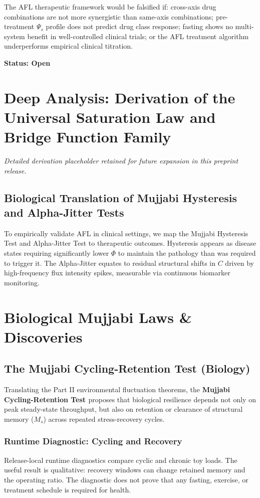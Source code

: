 \documentclass[12pt,a4paper]{article}
\begin{document}
The AFL therapeutic framework would be falsified if: cross-axis drug combinations are not more synergistic than same-axis combinations; pre-treatment $\Psi_s$ profile does not predict drug class response; fasting shows no multi-system benefit in well-controlled clinical trials; or the AFL treatment algorithm underperforms empirical clinical titration.

\textbf{Status: Open}


\section{Deep Analysis: Derivation of the Universal Saturation Law and Bridge Function Family}
\noindent\textit{Detailed derivation placeholder retained for future expansion in this preprint release.}


\subsection{Biological Translation of Mujjabi Hysteresis and Alpha-Jitter Tests}
To empirically validate AFL in clinical settings, we map the Mujjabi Hysteresis Test and Alpha-Jitter Test to therapeutic outcomes. Hysteresis appears as disease states requiring significantly lower $\Phi$ to maintain the pathology than was required to trigger it. The Alpha-Jitter equates to residual structural shifts in $C$ driven by high-frequency flux intensity spikes, measurable via continuous biomarker monitoring.


\section{Biological Mujjabi Laws \& Discoveries}

\subsection{The Mujjabi Cycling-Retention Test \cite{MujjabiPartII2026} (Biology)}
Translating the Part II environmental fluctuation theorems, the \textbf{Mujjabi Cycling-Retention Test \cite{MujjabiPartII2026}} proposes that biological resilience depends not only on peak steady-state throughput, but also on retention or clearance of structural memory ($M_s$) across repeated stress-recovery cycles.

\subsubsection{Runtime Diagnostic: Cycling and Recovery}
Release-local runtime diagnostics compare cyclic and chronic toy loads. The useful result is qualitative: recovery windows can change retained memory and the operating ratio. The diagnostic does not prove that any fasting, exercise, or treatment schedule is required for health.
\end{document}

